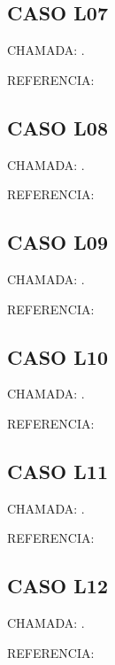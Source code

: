 \documentclass{undftex}
\begin{document}
\begin{refsection}\section*{CASO L07} CHAMADA: . \textcite{l07}\par REFERENCIA:\par\printbibliography[heading=none,check=undfconsultadas]\end{refsection}\clearpage
\begin{refsection}\section*{CASO L08} CHAMADA: . \textcite{l08}\par REFERENCIA:\par\printbibliography[heading=none,check=undfconsultadas]\end{refsection}\clearpage
\begin{refsection}\section*{CASO L09} CHAMADA: . \textcite{l09}\par REFERENCIA:\par\printbibliography[heading=none,check=undfconsultadas]\end{refsection}\clearpage
\begin{refsection}\section*{CASO L10} CHAMADA: . \textcite{l10}\par REFERENCIA:\par\printbibliography[heading=none,check=undfconsultadas]\end{refsection}\clearpage
\begin{refsection}\section*{CASO L11} CHAMADA: . \textcite{l11}\par REFERENCIA:\par\printbibliography[heading=none,check=undfconsultadas]\end{refsection}\clearpage
\begin{refsection}\section*{CASO L12} CHAMADA: . \textcite{l12}\par REFERENCIA:\par\printbibliography[heading=none,check=undfconsultadas]\end{refsection}\clearpage
\end{document}

